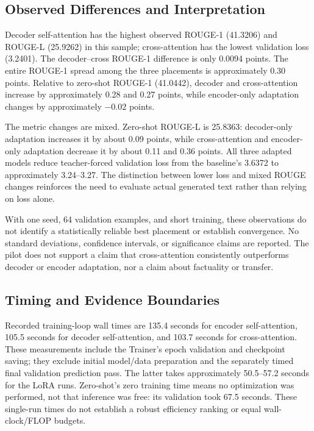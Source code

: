\documentclass[11pt, letterpaper]{article}
\begin{document}


\subsection{Observed Differences and Interpretation}
Decoder self-attention has the highest observed ROUGE-1 (41.3206) and
ROUGE-L (25.9262) in this sample; cross-attention has the lowest validation
loss (3.2401). The decoder--cross ROUGE-1 difference is only 0.0094 points.
The entire ROUGE-1 spread among the three placements is approximately 0.30
points. Relative to zero-shot ROUGE-1 (41.0442), decoder and cross-attention
increase by approximately 0.28 and 0.27 points, while encoder-only adaptation
changes by approximately $-0.02$ points.

The metric changes are mixed. Zero-shot ROUGE-L is 25.8363: decoder-only
adaptation increases it by about 0.09 points, while cross-attention and encoder-only
adaptation decrease it by about 0.11 and 0.36 points. All three adapted models
reduce teacher-forced validation loss from the baseline's 3.6372 to approximately
3.24--3.27. The distinction between lower loss and mixed ROUGE changes reinforces
the need to evaluate actual generated text rather than relying on loss alone.

With one seed, 64 validation examples, and short training, these observations do
not identify a statistically reliable best placement or establish convergence.
No standard deviations, confidence intervals, or significance claims are reported.
The pilot does not support a claim that cross-attention consistently outperforms
decoder or encoder adaptation, nor a claim about factuality or transfer.

\subsection{Timing and Evidence Boundaries}
Recorded training-loop wall times are 135.4 seconds for encoder self-attention,
105.5 seconds for decoder self-attention, and 103.7 seconds for cross-attention.
These measurements include the Trainer's epoch validation and checkpoint saving;
they exclude initial model/data preparation and the separately timed final
validation prediction pass. The latter takes approximately 50.5--57.2 seconds
for the LoRA runs. Zero-shot's zero training time means no optimization was
performed, not that inference was free: its validation took 67.5 seconds.
These single-run times do not establish a robust efficiency ranking or equal
wall-clock/FLOP budgets.
\end{document}
